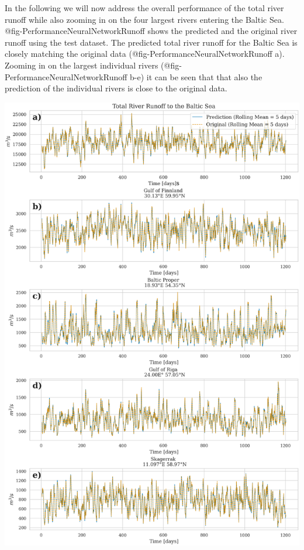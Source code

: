 \documentclass[
]{agujournal2019}
\begin{document}
In the following we will now address the overall performance of the
total river runoff while also zooming in on the four largest rivers
entering the Baltic Sea. @fig-PerformanceNeuralNetworkRunoff shows the
predicted and the original river runoff using the test dataset. The
predicted total river runoff for the Baltic Sea is closely matching the
original data (@fig-PerformanceNeuralNetworkRunoff a). Zooming in on the
largest individual rivers (@fig-PerformanceNeuralNetworkRunoff b-e) it
can be seen that that also the prediction of the individual rivers is
close to the original data.

\includegraphics{../src/figures/paper_total_river_runoff.png}
\end{document}
